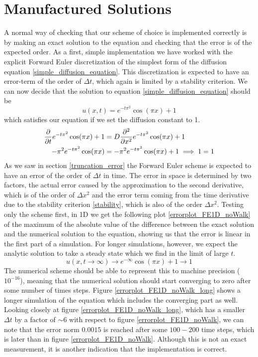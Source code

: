 \section{Manufactured Solutions}
A normal way of checking that our scheme of choice is implemented correctly is by making an exact solution to the equation and checking that the error is of the expected order. 
As a first, simple implementation we have worked with the explicit Forward Euler discretization of the simplest form of the diffusion equation \ref{simple_diffusion_equation}. 
This discretization is expected to have an error-term of the order of $\Delta t$, which again is limited by a stability criterion. 
We can now decide that the solution to equation \ref{simple_diffusion_equation} should be
\begin{equation}\label{manifactured_solution_1D}
 u(x,t) = e^{-t\pi^2}\cos(\pi x) +1
\end{equation}
which satisfies our equation if we set the diffusion constant to 1.
\begin{align}
 \frac{\partial }{\partial t}e^{-t\pi^2}\cos(\pi x) +1 &= D\frac{\partial^2}{\partial x^2}e^{-t\pi^2}\cos(\pi x) +1\\
 -\pi^2e^{-t\pi^2}\cos(\pi x) &= -\pi^2e^{-t\pi^2}\cos(\pi x) +1 \implies 1 = 1
\end{align}
As we saw in section \ref{truncation_error} the Forward Euler scheme is expected to have an error of the order of $\Delta t$ in time. 
The error in space is determined by two factors, the actual error caused by the approximation to the second derivative, which is of the order of $\Delta x^2$ and the error term coming from the time derivative due to the stability criterion \ref{stability}, which is also of the order $\Delta x^2$. 
Testing only the scheme first, in 1D we get the following plot \ref{errorplot_FE1D_noWalk} of the maximum of the absolute value of the difference between the exact solution and the numerical solution to the equation, showing us that the error is linear in the first part of a simulation. 
For longer simulations, however, we expect the analytic solution to take a steady state which we find in the limit of large $t$. 
\begin{equation}
 u(x,t\to\infty) \to e^{-\infty}\cos(\pi x) +1 \to 1
\end{equation}
The numerical scheme should be able to represent this to machine precision ($10^{-16}$), meaning that the numerical solution should start converging to zero after some number of times steps. 
Figure \ref{errorplot_FE1D_noWalk_long} shows a longer simulation of the equation which includes the converging part as well. 
Looking closely at figure \ref{errorplot_FE1D_noWalk_long}, which has a smaller $\Delta t$ by a factor of $\sim6$ with respect to figure \ref{errorplot_FE1D_noWalk}, we can note that the error norm $0.0015$ is reached after some $100-200$ time steps, which is later than in figure \ref{errorplot_FE1D_noWalk}. 
Although this is not an exact measurement, it is another indication that the implementation is correct.


